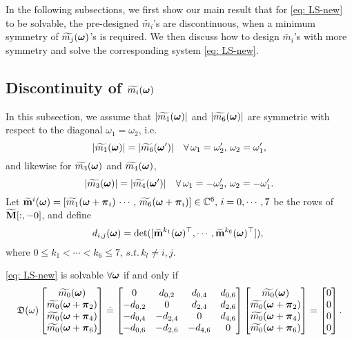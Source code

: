 In the following subsections, we first show our main result that for \eqref{eq: LS-new} to be solvable, the pre-designed $\widetilde{m_i}$'s are discontinuous, when a minimum symmetry of $\widetilde{m_{j}}(\boldsymbol{\omega})$'s is required. We then discuss how to design $\widetilde{m_i}$'s with more symmetry and solve the corresponding system \eqref{eq: LS-new}.

\subsection{Discontinuity of $\widetilde{m_{i}}(\boldsymbol{\omega})$}
In this subsection, we assume that
$|\widetilde{m_{1}}(\boldsymbol{\omega})|$ and $|\widetilde{m_{6}}(\boldsymbol{\omega})|$ are symmetric with respect to the diagonal $\omega_1=\omega_2$, i.e.
$$ |\widetilde{m_1}(\boldsymbol{\omega})| = |\widetilde{m_6}(\boldsymbol{\omega}')|\quad \forall\, \omega_1=\omega_2', \,\omega_2=\omega_1',$$
and likewise for $\widetilde{m_{3}}(\boldsymbol{\omega})$ and $\widetilde{m_{4}}(\boldsymbol{\omega})$,
$$ |\widetilde{m_3}(\boldsymbol{\omega})| = |\widetilde{m_4}(\boldsymbol{\omega}')|\quad \forall\, \omega_1=-\omega_2', \,\omega_2=-\omega_1'.$$
Let $\widetilde{\mathbf{m}}^{i}(\boldsymbol{\omega}) = [\widetilde{m_1}(\boldsymbol{\omega}+\boldsymbol{\pi}_i)\, \cdots,\,\widetilde{m_6}(\boldsymbol{\omega}+\boldsymbol{\pi}_i)]\in\mathbb{C}^6,\, i = 0,\cdots,7$ be the rows of $\widetilde{\mathbf{M}}[:,-0]$, and define $$d_{i,j}(\boldsymbol{\omega}) = \det([\widetilde{\mathbf{m}}^{k_1}(\boldsymbol{\omega})^\top,\cdots,\widetilde{\mathbf{m}}^{k_6}(\boldsymbol{\omega})^\top]),\;$$ where $0\leq k_1<\cdots<k_6\leq 7,\, s.t.\, k_l\neq i,j.$
\begin{lemma}\label{lem: subM-singular-sys}
\eqref{eq: LS-new} is solvable $\forall \boldsymbol{\omega}$ if and only if \vspace{.5em}
\begin{align}
\label{eq: singular-cond}
\mathfrak{D}(\omega)\begin{bmatrix}
\widetilde{m_{0}}(\boldsymbol{\omega})\\
\widetilde{m_{0}}(\boldsymbol{\omega}+\boldsymbol{\pi}_{2})\\
\widetilde{m_{0}}(\boldsymbol{\omega}+\boldsymbol{\pi}_{4})\\
\widetilde{m_{0}}(\boldsymbol{\omega}+\boldsymbol{\pi}_{6})
\end{bmatrix}
\doteq
\begin{bmatrix}
0 & d_{0,2} & d_{0,4} & d_{0,6}\\
-d_{0,2} & 0 & d_{2,4} & d_{2,6}\\
-d_{0,4} & -d_{2,4} & 0 & d_{4,6}\\
-d_{0,6} & -d_{2,6} & -d_{4,6} & 0
\end{bmatrix}
\begin{bmatrix}
\widetilde{m_{0}}(\boldsymbol{\omega})\\
\widetilde{m_{0}}(\boldsymbol{\omega}+\boldsymbol{\pi}_{2})\\
\widetilde{m_{0}}(\boldsymbol{\omega}+\boldsymbol{\pi}_{4})\\
\widetilde{m_{0}}(\boldsymbol{\omega}+\boldsymbol{\pi}_{6})
\end{bmatrix}
= \begin{bmatrix}
0\\0\\0\\0
\end{bmatrix}.
\end{align}
\end{lemma}
